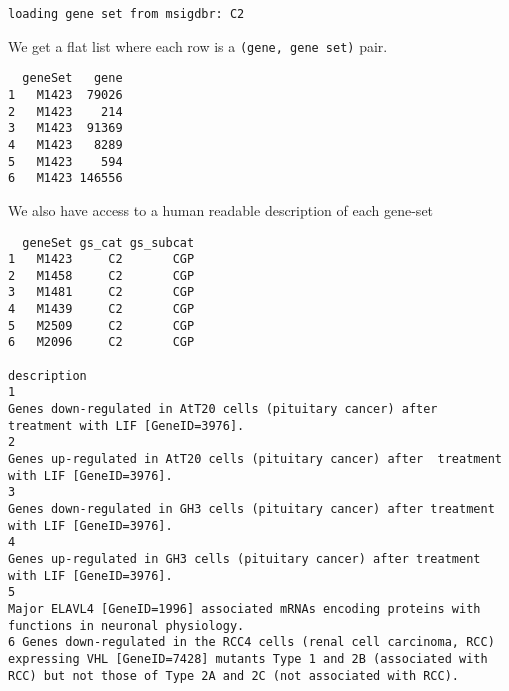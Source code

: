 \documentclass[
  letterpaper,
  DIV=11,
  numbers=noendperiod]{scrreprt}
\newenvironment{Shaded}{\begin{snugshade}}{\end{snugshade}}
\newcommand{\FunctionTok}[1]{\textcolor[rgb]{0.28,0.35,0.67}{#1}}
\newcommand{\NormalTok}[1]{\textcolor[rgb]{0.00,0.23,0.31}{#1}}
\newcommand{\SpecialCharTok}[1]{\textcolor[rgb]{0.37,0.37,0.37}{#1}}
\begin{document}
\begin{verbatim}
loading gene set from msigdbr: C2
\end{verbatim}

We get a flat list where each row is a \texttt{(gene,\ gene\ set)} pair.

\begin{Shaded}
\end{Shaded}

\begin{verbatim}
  geneSet   gene
1   M1423  79026
2   M1423    214
3   M1423  91369
4   M1423   8289
5   M1423    594
6   M1423 146556
\end{verbatim}

We also have access to a human readable description of each gene-set

\begin{Shaded}
\end{Shaded}

\begin{verbatim}
  geneSet gs_cat gs_subcat
1   M1423     C2       CGP
2   M1458     C2       CGP
3   M1481     C2       CGP
4   M1439     C2       CGP
5   M2509     C2       CGP
6   M2096     C2       CGP
                                                                                                                                                                                             description
1                                                                                                        Genes down-regulated in AtT20 cells (pituitary cancer) after  treatment with LIF [GeneID=3976].
2                                                                                                          Genes up-regulated in AtT20 cells (pituitary cancer) after  treatment with LIF [GeneID=3976].
3                                                                                                           Genes down-regulated in GH3 cells (pituitary cancer) after treatment with LIF [GeneID=3976].
4                                                                                                             Genes up-regulated in GH3 cells (pituitary cancer) after treatment with LIF [GeneID=3976].
5                                                                                                   Major ELAVL4 [GeneID=1996] associated mRNAs encoding proteins with functions in neuronal physiology.
6 Genes down-regulated in the RCC4 cells (renal cell carcinoma, RCC) expressing VHL [GeneID=7428] mutants Type 1 and 2B (associated with RCC) but not those of Type 2A and 2C (not associated with RCC).
\end{verbatim}
\end{document}
